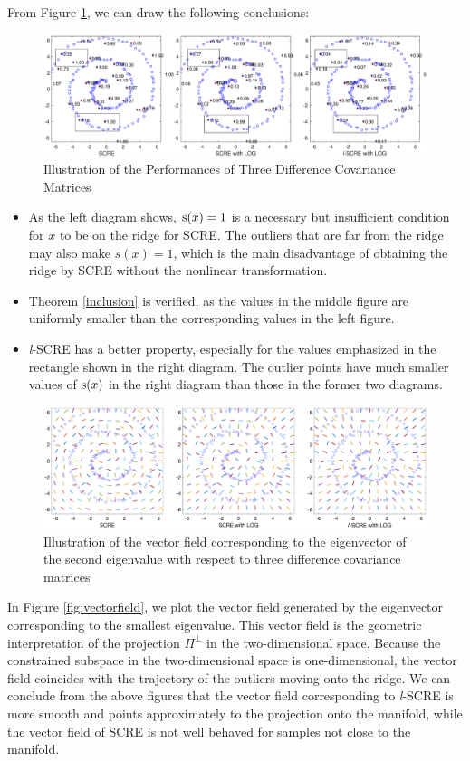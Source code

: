 \documentclass[aos,preprint]{imsart}
\theoremstyle{remark}
\begin{document}
 From Figure \ref{fig:Diff Covariance}, we can draw the following conclusions:
  \begin{figure}[h] %
    \includegraphics[width=\linewidth]{compare5n.eps} 
    \caption{Illustration of the Performances of Three Difference Covariance Matrices }
    \label{fig:Diff Covariance}
 \end{figure}
 \begin{itemize}
 \item As the left diagram shows, ${\rm s}(x)=1$ is a necessary but insufficient condition for $x$ to be on the ridge for SCRE. The outliers that are far from the ridge may also make $s(x)=1$, which is the main disadvantage of obtaining the ridge by SCRE without the nonlinear transformation.
 \item Theorem \ref{inclusion} is verified, as the values in the middle figure are uniformly smaller than the corresponding values in the left figure.
\item {\it l}-SCRE has a better property, especially for the values emphasized in the rectangle shown in the right diagram. The outlier points have much smaller values of ${\rm s}(x)$ in the right diagram than those in the former two diagrams.
 \end{itemize}
 
   \begin{figure}[h] %
    \includegraphics[width=\linewidth]{vectorfield2.eps} 
    \caption{Illustration of the vector field corresponding to the eigenvector of the second eigenvalue with respect to three difference covariance matrices }
    \label{fig:vectorfield}
 \end{figure}
In Figure \eqref{fig:vectorfield}, we plot the vector field generated by the eigenvector corresponding to the smallest eigenvalue. This vector field is the geometric interpretation of the projection $\Pi^{\perp}$ in the two-dimensional space. Because the constrained subspace in the two-dimensional space is one-dimensional, the vector field coincides with the trajectory of the outliers moving onto the ridge. We can conclude from the above figures that the vector field corresponding to {\it l}-SCRE is more smooth and points approximately to the projection onto the manifold, while the vector field of SCRE is not well behaved for samples not close to the manifold.
\end{document}
